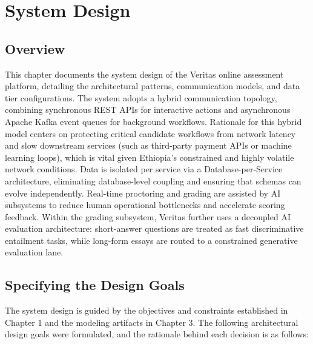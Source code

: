 \section{System Design}

\subsection{Overview}
This chapter documents the system design of the Veritas online assessment platform, detailing the architectural patterns, communication models, and data tier configurations. The system adopts a hybrid communication topology, combining synchronous REST APIs for interactive actions and asynchronous Apache Kafka event queues for background workflows. Rationale for this hybrid model centers on protecting critical candidate workflows from network latency and slow downstream services (such as third-party payment APIs or machine learning loops), which is vital given Ethiopia's constrained and highly volatile network conditions. Data is isolated per service via a Database-per-Service architecture, eliminating database-level coupling and ensuring that schemas can evolve independently. Real-time proctoring and grading are assisted by AI subsystems to reduce human operational bottlenecks and accelerate scoring feedback. Within the grading subsystem, Veritas further uses a decoupled AI evaluation architecture: short-answer questions are treated as fast discriminative entailment tasks, while long-form essays are routed to a constrained generative evaluation lane.

\subsection{Specifying the Design Goals}
The system design is guided by the objectives and constraints established in Chapter 1 and the modeling artifacts in Chapter 3. The following architectural design goals were formulated, and the rationale behind each decision is as follows:

